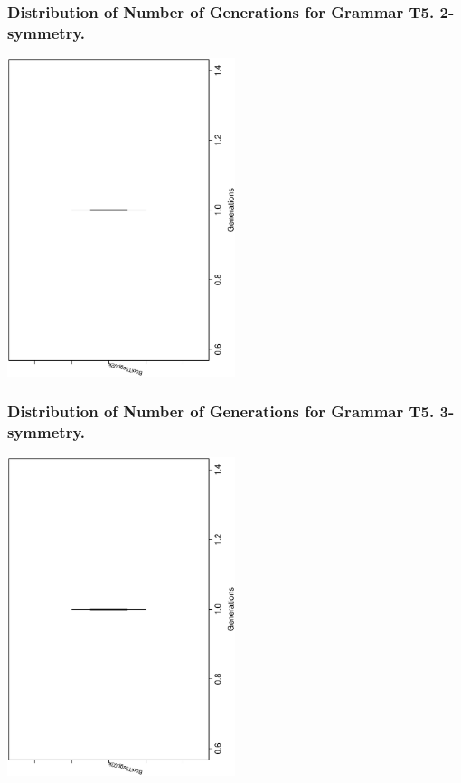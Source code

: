 \documentclass[18pt,c]{beamer}
\begin{document}
 \begin{frame}
 \frametitle{ Distribution of Number of Generations for Grammar T5. 2-symmetry. }
 \begin{center}
\includegraphics[width=0.5\textwidth, angle=-90]
{ExpFboxplottGenerations000.eps}
 \end{center}
 \label{ExpFboxplottGenerations000.eps}  
 \end{frame}

 \begin{frame}
 \frametitle{ Distribution of Number of Generations for Grammar T5. 3-symmetry. }
 \begin{center}
\includegraphics[width=0.5\textwidth, angle=-90]
{ExpFboxplottGenerations001.eps}
 \end{center}
 \label{ExpFboxplottGenerations001.eps}  
 \end{frame}
\end{document}
